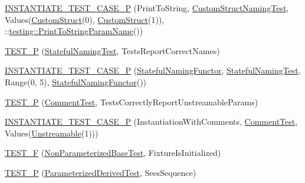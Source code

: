 \begin{DoxyCompactItemize}
\item 
\mbox{\hyperlink{_obj__test_2lib_2googletest-release-1_88_81_2googletest_2test_2googletest-param-test-test_8cc_a4a9392ba30b63ac9cb9c07132cded59e}{I\+N\+S\+T\+A\+N\+T\+I\+A\+T\+E\+\_\+\+T\+E\+S\+T\+\_\+\+C\+A\+S\+E\+\_\+P}} (Print\+To\+String, \mbox{\hyperlink{class_custom_struct_naming_test}{Custom\+Struct\+Naming\+Test}}, Values(\mbox{\hyperlink{struct_custom_struct}{Custom\+Struct}}(0), \mbox{\hyperlink{struct_custom_struct}{Custom\+Struct}}(1)), \+::\mbox{\hyperlink{structtesting_1_1_print_to_string_param_name}{testing\+::\+Print\+To\+String\+Param\+Name}}())
\item 
\mbox{\hyperlink{_obj__test_2lib_2googletest-release-1_88_81_2googletest_2test_2googletest-param-test-test_8cc_a567e8106d701ab56bdc7e610ef119450}{T\+E\+S\+T\+\_\+P}} (\mbox{\hyperlink{class_stateful_naming_test}{Stateful\+Naming\+Test}}, Tests\+Report\+Correct\+Names)
\item 
\mbox{\hyperlink{_obj__test_2lib_2googletest-release-1_88_81_2googletest_2test_2googletest-param-test-test_8cc_a8758d8486ef133049c7fbd70f070fc13}{I\+N\+S\+T\+A\+N\+T\+I\+A\+T\+E\+\_\+\+T\+E\+S\+T\+\_\+\+C\+A\+S\+E\+\_\+P}} (\mbox{\hyperlink{struct_stateful_naming_functor}{Stateful\+Naming\+Functor}}, \mbox{\hyperlink{class_stateful_naming_test}{Stateful\+Naming\+Test}}, Range(0, 5), \mbox{\hyperlink{struct_stateful_naming_functor}{Stateful\+Naming\+Functor}}())
\item 
\mbox{\hyperlink{_obj__test_2lib_2googletest-release-1_88_81_2googletest_2test_2googletest-param-test-test_8cc_a5c5935ee04b0f74f29114ed7e1fa2315}{T\+E\+S\+T\+\_\+P}} (\mbox{\hyperlink{class_comment_test}{Comment\+Test}}, Tests\+Correctly\+Report\+Unstreamable\+Params)
\item 
\mbox{\hyperlink{_obj__test_2lib_2googletest-release-1_88_81_2googletest_2test_2googletest-param-test-test_8cc_a79404c001e02d49160357e904da2eb74}{I\+N\+S\+T\+A\+N\+T\+I\+A\+T\+E\+\_\+\+T\+E\+S\+T\+\_\+\+C\+A\+S\+E\+\_\+P}} (Instantiation\+With\+Comments, \mbox{\hyperlink{class_comment_test}{Comment\+Test}}, Values(\mbox{\hyperlink{class_unstreamable}{Unstreamable}}(1)))
\item 
\mbox{\hyperlink{_obj__test_2lib_2googletest-release-1_88_81_2googletest_2test_2googletest-param-test-test_8cc_af8865fa8411285bd2492b5105f35a7de}{T\+E\+S\+T\+\_\+F}} (\mbox{\hyperlink{class_non_parameterized_base_test}{Non\+Parameterized\+Base\+Test}}, Fixture\+Is\+Initialized)
\item 
\mbox{\hyperlink{_obj__test_2lib_2googletest-release-1_88_81_2googletest_2test_2googletest-param-test-test_8cc_a92492aa8cc7fda6eb6438c6f7c74e478}{T\+E\+S\+T\+\_\+P}} (\mbox{\hyperlink{class_parameterized_derived_test}{Parameterized\+Derived\+Test}}, Sees\+Sequence)

\end{DoxyCompactItemize}
